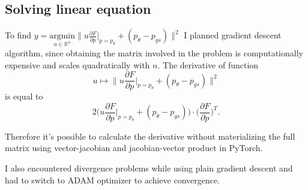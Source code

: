 \documentclass[a4paper,10pt]{report}
\begin{document}
\subsection{Solving linear equation}
To find $y = \underset{u\in \mathbb{R}^n}{\mathrm{argmin}} \bigg\|u \frac{\partial F}{\partial p}\bigg|_{p=p_\theta} + (p_\theta-p_{gs})\bigg\|^2$ I planned gradient descent algorithm, since obtaining the matrix involved in the problem is computationally expensive and scales quadratically with $n$.
The derivative of function
\begin{equation*}
 u\mapsto \bigg\|u \frac{\partial F}{\partial p}\bigg|_{p=p_\theta} + (p_\theta-p_{gs})\bigg\|^2
 \end{equation*}
 is equal to
 \begin{equation*}
  2 \bigg( u \frac{\partial F}{\partial p}\bigg|_{p=p_\theta} + (p_\theta-p_{gs})  \bigg) \cdot \bigg(\frac{\partial F}{\partial p}\bigg)^T.
\end{equation*}

Therefore it's possible to calculate the derivative without materializing the full matrix using vector-jacobian and jacobian-vector product in PyTorch.

I also encountered divergence problems while using plain gradient descent and had to switch to ADAM optimizer to achieve convergence.
\end{document}
